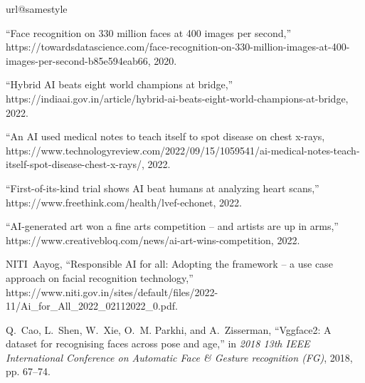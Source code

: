\documentclass[journal]{IEEEtran}
\begin{document}
\begin{thebibliography}{100}
\providecommand{\url}[1]{#1}
\csname url@samestyle\endcsname
\providecommand{\newblock}{\relax}
\providecommand{\bibinfo}[2]{#2}
\providecommand{\BIBentrySTDinterwordspacing}{\spaceskip=0pt\relax}
\providecommand{\BIBentryALTinterwordstretchfactor}{4}
\providecommand{\BIBentryALTinterwordspacing}{\spaceskip=\fontdimen2\font plus
\BIBentryALTinterwordstretchfactor\fontdimen3\font minus
  \fontdimen4\font\relax}
\providecommand{\BIBforeignlanguage}[2]{{%
\expandafter\ifx\csname l@#1\endcsname\relax
\typeout{** WARNING: IEEEtran.bst: No hyphenation pattern has been}%
\typeout{** loaded for the language `#1'. Using the pattern for}%
\typeout{** the default language instead.}%
\else
\language=\csname l@#1\endcsname
\fi
#2}}
\providecommand{\BIBdecl}{\relax}
\BIBdecl

``Face recognition on 330 million faces at 400 images per second,''
  \url{https://towardsdatascience.com/face-recognition-on-330-million-images-at-400-images-per-second-b85e594eab66},
  2020.

``Hybrid AI beats eight world champions at bridge,''
  \url{https://indiaai.gov.in/article/hybrid-ai-beats-eight-world-champions-at-bridge},
  2022.

``An AI used medical notes to teach itself to spot disease on chest x-rays, \url{https://www.technologyreview.com/2022/09/15/1059541/ai-medical-notes-teach-itself-spot-disease-chest-x-rays/},
  2022.

``First-of-its-kind trial shows AI beat humans at analyzing heart scans,''
  \url{https://www.freethink.com/health/lvef-echonet}, 2022.

``AI-generated art won a fine arts competition – and artists are up in
  arms,'' \url{https://www.creativebloq.com/news/ai-art-wins-competition},
  2022.

\relax NITI~Aayog, ``Responsible AI for all: Adopting the framework – a use case approach on facial recognition technology,''
  \url{https://www.niti.gov.in/sites/default/files/2022-11/Ai_for_All_2022_02112022_0.pdf}.

Q.~Cao, L.~Shen, W.~Xie, O.~M. Parkhi, and A.~Zisserman, ``Vggface2: A dataset
  for recognising faces across pose and age,'' in \emph{2018 13th IEEE
  International Conference on Automatic Face \& Gesture recognition (FG)}, 2018, pp. 67--74.


\end{thebibliography}
\end{document}
